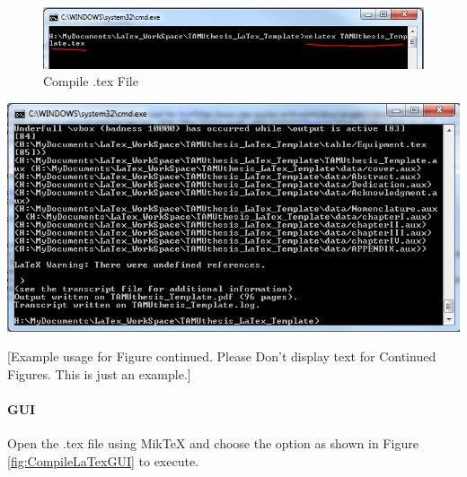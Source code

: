 \begin{figure}[!htbp]
\begin{center}
\includegraphics[width=\textwidth, height=0.4\textheight,keepaspectratio]{graphic/TAMUthesis_CMD_windows_compile.png}
\caption{Compile .tex File}
\label{fig:CompileLaTex}
\end{center}
\end{figure}
  
\begin{Contfigure}[!htbp]
\captionsetup{list=no}
\begin{center}
\includegraphics[width=\textwidth, height=0.4\textheight,keepaspectratio]{graphic/TAMUthesis_CMD_windows_compile2.png}
\caption{} %
\label{fig:CompileLaTex2}
[Example usage for Figure continued. Please Don't display text for Continued Figures. This is just an example.]
\end{center}
\end{Contfigure}  
  
  
\paragraph{GUI}
Open the .tex file using MikTeX and choose the option as shown in Figure \ref{fig:CompileLaTexGUI} to execute.

